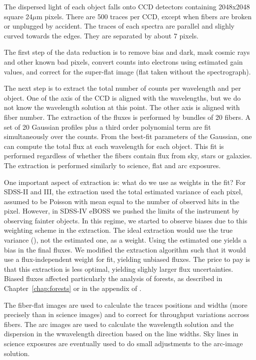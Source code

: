 The dispersed light of each object falls onto CCD detectors containing 
2048x2048 square 24$\mu$m pixels. 
There are 500 traces per CCD, except when fibers are broken or unplugged by accident. 
The traces of each spectra are parallel and slighly curved towards the edges. 
They are separated by about 7 pixels. 

The first step of the data reduction is to remove bias and dark, mask 
cosmic rays and other known bad pixels, 
convert counts into electrons using estimated gain values, 
and correct for the super-flat image (flat taken without the spectrograph). 

The next step is to extract the total number of counts per wavelength and per object.
One of the axis of the CCD is aligned with the wavelengths, but we do not know the
wavelength solution at this point. The other axis is aligned with fiber number. 
The extraction of the fluxes is performed by bundles of 20 fibers. A set of 20 Gaussian
profiles plus a third order polynomial term are fit simultaneously over the counts. 
From the best-fit parameters of the Gaussian, one can compute the total flux at each 
wavelength for each object. This fit is performed regardless of whether the fibers contain 
flux from sky, stars or galaxies. 
The extraction is performed similarly to science, flat and arc exposures. 


One important aspect of extraction is: what do we use as weights in the fit?
For SDSS-II and III, the extraction used the total estimated variance of each pixel,
assumed to be Poisson with mean equal to the number of observed hits in the pixel. 
However, in SDSS-IV eBOSS we pushed the limits of the instrument by observing fainter
objects. In this regime, we started to observe biases due to this weighting scheme in 
the extraction. The ideal extraction would use the true variance 
(\cite{horneOptimalExtractionAlgorithm1986}), not the estimated
one, as a weight. Using the estimated one yields a bias in the final fluxes. 
We modified the extraction algorithm such that it would use a flux-independent weight 
for fit, yielding unbiased fluxes. The price to pay is that this extraction is less 
optimal, yielding slighly larger flux uncertainties. Biased fluxes affected 
particularly the analysis of \lya forests, as described in Chapter~\ref{chap:forests}
or in the appendix of \cite{bautistaMeasurementBaryonAcoustic2017}.

The fiber-flat images are used to calculate the traces positions and widths 
(more precisely than in science images) 
and to correct for throughput variations accross fibers. 
The arc images are used to calculate the wavelength solution and 
the dispersion in the wwavelength direction based on the line widths. 
Sky lines in science exposures are eventually used to do small adjustments 
to the arc-image solution. 

